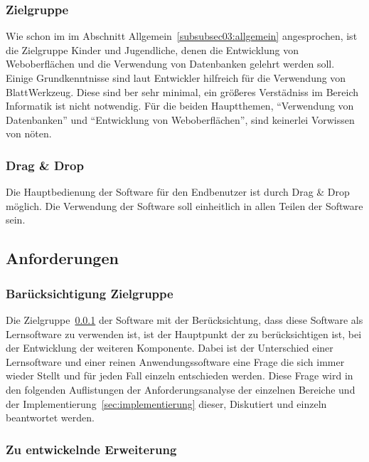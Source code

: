 \subsubsection{Zielgruppe}
\label{subsubsec03:zielgruppe}

Wie schon im im Abschnitt Allgemein~\ref{subsubsec03:allgemein} angesprochen, ist die Zielgruppe Kinder und Jugendliche, denen die Entwicklung von Weboberflächen und die Verwendung von Datenbanken gelehrt werden soll. Einige Grundkenntnisse sind laut Entwickler hilfreich für die Verwendung von BlattWerkzeug. Diese sind ber sehr minimal, ein größeres Verstädniss im Bereich Informatik ist nicht notwendig. Für die beiden Hauptthemen, ``Verwendung von Datenbanken'' und ``Entwicklung von Weboberflächen'', sind keinerlei Vorwissen von nöten. 

\subsubsection{Drag \& Drop}
\label{subsubsec03:dragAndDrop}

Die Hauptbedienung der Software für den Endbenutzer ist durch Drag \& Drop möglich. Die Verwendung der Software soll einheitlich in allen Teilen der Software sein.

\subsection{Anforderungen}
\label{subsec03:was_benoetigt}

\subsubsection{Barücksichtigung Zielgruppe}
\label{subsubsec03:zielgruppe_beruecksichtigung}

Die Zielgruppe~\ref{subsubsec03:zielgruppe} der Software mit der Berücksichtung, dass diese Software als Lernsoftware zu verwenden ist, ist der Hauptpunkt der zu berücksichtigen ist, bei der Entwicklung der weiteren Komponente.
Dabei ist der Unterschied einer Lernsoftware und einer reinen Anwendungssoftware eine Frage die sich immer wieder Stellt und für jeden Fall einzeln entschieden werden. Diese Frage wird in den folgenden Auflistungen der Anforderungsanalyse der einzelnen Bereiche und der Implementierung~\ref{sec:implementierung} dieser, Diskutiert und einzeln beantwortet werden.

\subsubsection{Zu entwickelnde Erweiterung}
\label{subsubsec03:zu_entwickeln}


